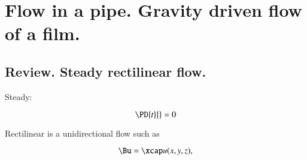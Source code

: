 %
%

\chapter{Flow in a pipe.  Gravity driven flow of a film.}
\label{chap:continuumL12}
{}
\date{Feb 12, 2012}

\beginArtWithToc

%
%
\section{Review.  Steady rectilinear flow.}

Steady:

\begin{equation}\label{eqn:continuumL12:10}
\PD{t}{} = 0
\end{equation}

Rectilinear is a unidirectional flow such as

\begin{equation}\label{eqn:continuumL12:30}
\Bu = \xcap u( x, y, z ),
\end{equation}

